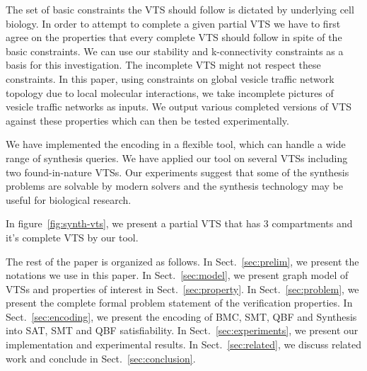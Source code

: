 %
The set of basic constraints the VTS should follow is dictated by underlying cell biology.   
%
In order to attempt to complete a given partial VTS we have to first agree on the properties that every complete VTS should follow in spite of the basic constraints. 
%
We can use our stability and k-connectivity constraints as a basis for this investigation.   
%
The incomplete VTS might not respect these constraints. 
%
In this paper, using constraints on global vesicle traffic network topology due to local molecular interactions, we take incomplete pictures of vesicle traffic networks as inputs.
%
We output various completed versions of VTS against these properties which can then be tested experimentally.
%

We have implemented the encoding in a flexible tool, which can handle a wide range of synthesis queries. 
%
We have applied our tool on several VTSs including
two found-in-nature VTSs.
%
Our experiments suggest that some of the synthesis problems are solvable by modern solvers and the synthesis technology may be useful for biological research.
%

\begin{example}
	In figure~\ref{fig:synth-vts}, we present a partial VTS that has 3 compartments and it's complete VTS by our tool.
	
\end{example}


The rest of the paper is organized as follows. 
%
In Sect.~\ref{sec:prelim}, we present the notations we use in this paper. 
%
In Sect.~\ref{sec:model}, we present graph model of VTSs and  properties of interest in Sect.~\ref{sec:property}.
%
%
%
In Sect.~\ref{sec:problem}, we present the complete formal problem statement of the verification properties.
%
In Sect.~\ref{sec:encoding}, we present the encoding of BMC, SMT, QBF and Synthesis into SAT, SMT and QBF satisfiability. 
%
In Sect.~\ref{sec:experiments}, we present our implementation and experimental results. 
%
In Sect.~\ref{sec:related}, we discuss related work and conclude in Sect.~\ref{sec:conclusion}.

%
